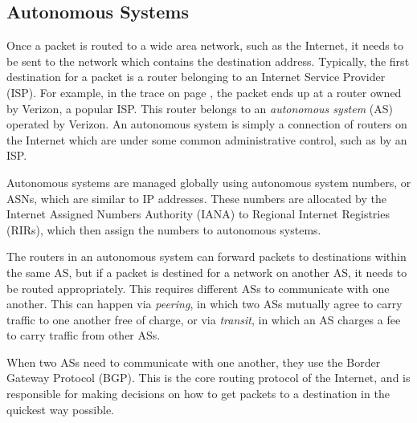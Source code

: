 \subsection{Autonomous Systems}

Once a packet is routed to a wide area network, such as the Internet, it needs to be sent to the network which contains the destination address. Typically, the first destination for a packet is a router belonging to an Internet Service Provider (ISP). For example, in the  trace on page \pageref{code:traceroute}, the packet ends up at a router owned by Verizon, a popular ISP. This router belongs to an \emph{autonomous system} (AS) operated by Verizon. An autonomous system is simply a connection of routers on the Internet which are under some common administrative control, such as by an ISP.

Autonomous systems are managed globally using autonomous system numbers, or ASNs, which are similar to IP addresses. These numbers are allocated by the Internet Assigned Numbers Authority (IANA) to Regional Internet Registries (RIRs), which then assign the numbers to autonomous systems.

The routers in an autonomous system can forward packets to destinations within the same AS, but if a packet is destined for a network on another AS, it needs to be routed appropriately. This requires different ASs to communicate with one another. This can happen via \emph{peering}, in which two ASs mutually agree to carry traffic to one another free of charge, or via \emph{transit}, in which an AS charges a fee to carry traffic from other ASs.

When two ASs need to communicate with one another, they use the Border Gateway Protocol (BGP). This is the core routing protocol of the Internet, and is responsible for making decisions on how to get packets to a destination in the quickest way possible. 